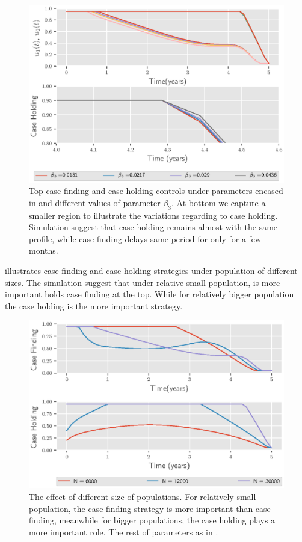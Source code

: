 %
\begin{figure}[H]
  \centering
  \includegraphics{Figures/figure_2_two_strain_tbm}
  \caption{
    Top case finding and case holding controls 
    under parameters encased in  and
    different values of parameter $\beta_3$. At bottom we capture a smaller
    region to illustrate the variations regarding to case holding. Simulation 
    suggest 
    that case holding remains almost with the same profile, while case finding 
    delays same period for only for a few months.
  }\label{fig:figure2twostraintbm}
\end{figure}

 illustrates case finding and case holding 
strategies under population of different sizes. The simulation suggest that
under relative small population, is more important holds case finding at the 
top. While for relatively bigger population the case holding is the more 
important strategy.
\begin{figure}[H]
  \centering
  \includegraphics{Figures/figure_3_two_strain_tbm}
  \caption{
    The effect of different size of populations. For 
    relatively small population, the case finding strategy is more important 
    than case finding, meanwhile for  bigger populations, the case holding 
    plays a more important role. The rest of parameters as in 
    .
  }
  \label{fig:figure3twostraintbm}
\end{figure}
